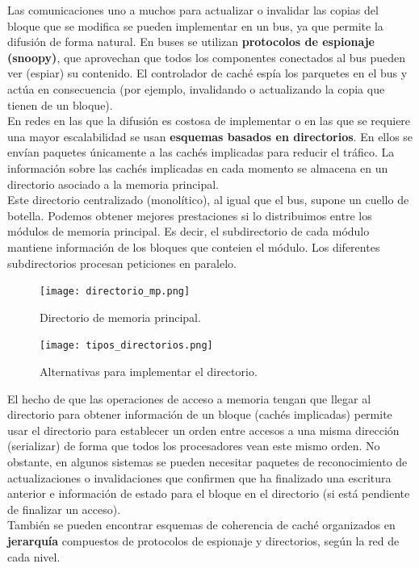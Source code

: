 \documentclass[12pt,spanish]{article}
\begin{document}
Las comunicaciones uno a muchos para actualizar o invalidar las copias del bloque que se modifica se pueden implementar en un bus, ya que permite la difusión de forma natural. En buses se utilizan \textbf{protocolos de espionaje (snoopy)}, que aprovechan que todos los componentes conectados al bus pueden ver (espiar) su contenido. El controlador de caché espía los parquetes en el bus y actúa en consecuencia (por ejemplo, invalidando o actualizando la copia que tienen de un bloque). \\

En redes en las que la difusión es costosa de implementar o en las que se requiere una mayor escalabilidad se usan \textbf{esquemas basados en directorios}. En ellos se envían paquetes únicamente a las cachés implicadas para reducir el tráfico. La información sobre las cachés implicadas en cada momento se almacena en un directorio asociado a la memoria principal.\\

Este directorio centralizado (monolítico), al igual que el bus, supone un cuello de botella. Podemos obtener mejores prestaciones si lo distribuimos entre los módulos de memoria principal. Es decir, el subdirectorio de cada módulo mantiene información de los bloques que conteien el módulo. Los diferentes subdirectorios procesan peticiones en paralelo.

\begin{figure}[H]
\centering
\texttt{[image: directorio\_mp.png]}
\caption{Directorio de memoria principal.}
\end{figure}

\begin{figure}[H]
\centering
\texttt{[image: tipos\_directorios.png]}
\caption{Alternativas para implementar el directorio.}
\end{figure}

El hecho de que las operaciones de acceso a memoria tengan que llegar al directorio para obtener información de un bloque (cachés implicadas) permite usar el directorio para establecer un orden entre accesos a una misma dirección (serializar) de forma que todos los procesadores vean este mismo orden. No obstante, en algunos sistemas se pueden necesitar paquetes de reconocimiento de actualizaciones o invalidaciones que confirmen que ha finalizado una escritura anterior e información de estado para el bloque en el directorio (si está pendiente de finalizar un acceso).\\

También se pueden encontrar esquemas de coherencia de caché organizados en \textbf{jerarquía} compuestos de protocolos de espionaje y directorios, según la red de cada nivel.
\end{document}
